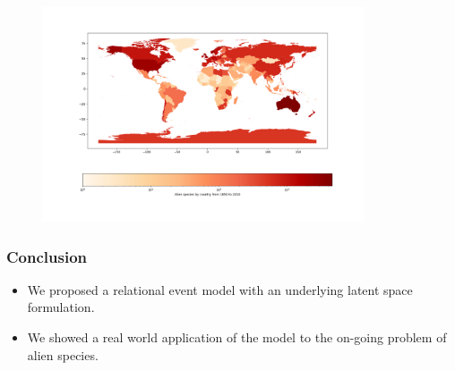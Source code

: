 \documentclass[
	11pt, %
]{beamer}
\begin{document}
\begin{frame}
\begin{figure}[ht]
    \centering
    \includegraphics[width=0.85\textwidth]{region_invasion.png}
\end{figure}
\end{frame}


\begin{frame}
\frametitle{Conclusion}
\begin{itemize}
\item We proposed a relational event model with an underlying latent space formulation.
\item We showed a real world application of the model to the on-going problem of alien species.
\end{itemize}
\end{frame}

\end{document}
